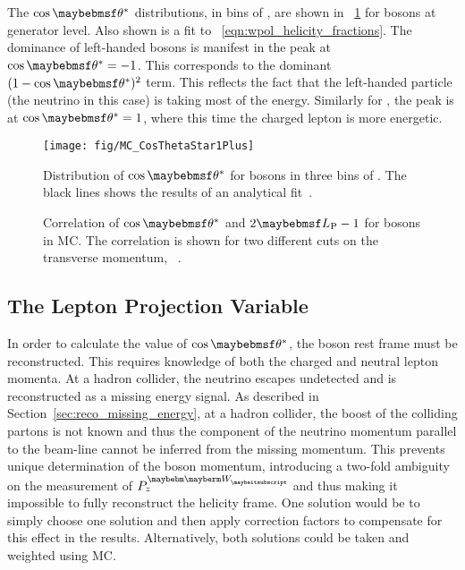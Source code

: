 The $\cos\thetastar$ distributions, in bins of \PtW, are shown in
\fig~\ref{fig:wpol_costheta} for \PWp bosons at generator level. Also shown is a
fit to \eqn~\ref{eqn:wpol_helicity_fractions}. The dominance of left-handed \PW
bosons is manifest in the peak at $\cos\thetastar = -1$. This corresponds to the
dominant $(1-\cos\thetastar)^2$ term. This reflects the fact that the
left-handed particle (the neutrino in this case) is taking most of the
energy. Similarly for \PWm, the peak is at $\cos\thetastar = 1$, where this time
the charged lepton is more energetic.

\begin{figure}[h!]
\centering
\texttt{[image: fig/MC\_CosThetaStar1Plus]}
\caption[Distribution of $\cos\thetastar$ for \PWp bosons in three bins of
\PtW.]{Distribution of $\cos\thetastar$ for \PWp bosons in three bins of \PtW. The black lines shows the results of an analytical fit~\cite{wpol_an}.}
\label{fig:wpol_costheta}
\end{figure}

\begin{figure}[h!]
\centering
{}\quad
\subfloat[[$\PtW > \unit{400}{\GeV}$]{
  \label{fig:wpol_costheta_corr400}\texttt{[image: fig/LP\_corr400]}}\quad
\caption[Correlation of $\cos\thetastar$ and $2\LP - 1$ for \PW bosons in
\ac{MC}]{Correlation of $\cos\thetastar$ and $2\LP - 1$ for \PW bosons in
  \ac{MC}. The correlation is shown for two different cuts on the transverse
  momentum, \PtW~\cite{wpol_an}.}
\label{fig:wpol_costheta_corr}
\end{figure}

\subsection{The Lepton Projection Variable}
\label{sec:wpol_lp}
In order to calculate the value of $\cos\thetastar$, the \PW boson rest frame
must be reconstructed. This requires knowledge of both the charged and neutral
lepton momenta. At a hadron collider, the neutrino escapes undetected and is
reconstructed as a missing energy signal. As described in
Section~\ref{sec:reco_missing_energy}, at a hadron collider, the boost of the
colliding partons is not known and thus the component of the neutrino momentum
parallel to the beam-line cannot be inferred from the missing momentum. This
prevents unique determination of the \PW boson momentum, introducing a two-fold
ambiguity on the measurement of $P^{\PW}_z$ and thus making it impossible to
fully reconstruct the helicity frame. One solution would be to simply choose one
solution and then apply correction factors to compensate for this effect in the
results. Alternatively, both solutions could be taken and weighted using \ac{MC}.

